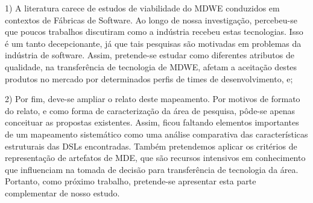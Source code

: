 
1) A literatura carece de estudos de viabilidade do MDWE conduzidos em contextos de Fábricas de Software. Ao longo de nossa investigação, percebeu-se que poucos trabalhos discutiram como a indústria recebeu estas tecnologias. Isso é um tanto decepcionante, já que tais pesquisas são motivadas em problemas da indústria de software. Assim, %
pretende-se estudar como diferentes atributos de qualidade, na transferência de tecnologia de MDWE, afetam a aceitação destes produtos no mercado por determinados perfis de times de desenvolvimento, e; %

2) Por fim, deve-se ampliar o relato deste mapeamento. Por motivos de formato do relato, e como forma de caracterização da área de pesquisa, pôde-se apenas conceituar as propostas existentes. Assim, ficou faltando elementos importantes de um mapeamento sistemático como uma análise comparativa das características estruturais das DSLs encontradas. Também pretendemos aplicar os critérios de representação de artefatos de MDE, que são recursos intensivos em conhecimento que influenciam na tomada de decisão para transferência de tecnologia da área. Portanto, como próximo trabalho, pretende-se apresentar esta parte complementar de nosso estudo.
